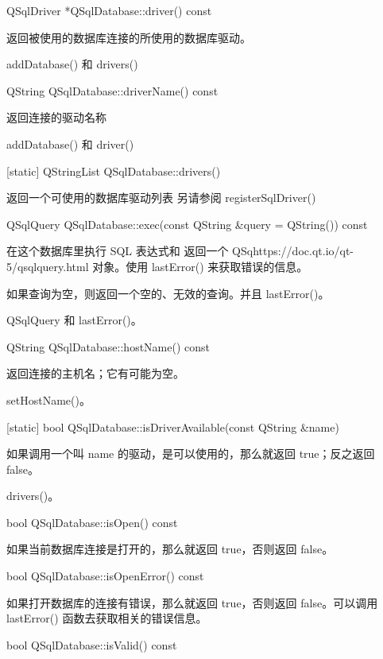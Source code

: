 QSqlDriver *QSqlDatabase::driver() const

返回被使用的数据库连接的所使用的数据库驱动。

\begin{seeAlso}
addDatabase() 和 drivers()
\end{seeAlso}

QString QSqlDatabase::driverName() const

返回连接的驱动名称

\begin{seeAlso}
addDatabase() 和 driver()
\end{seeAlso}

[static] QStringList QSqlDatabase::drivers()

返回一个可使用的数据库驱动列表 另请参阅 registerSqlDriver()

QSqlQuery QSqlDatabase::exec(const QString \&query = QString()) const


在这个数据库里执行 SQL 表达式和 返回一个 QSqhttps://doc.qt.io/qt-5/qsqlquery.html 对象。使用 lastError() 来获取错误的信息。

如果查询为空，则返回一个空的、无效的查询。并且 lastError()。

\begin{seeAlso}
QSqlQuery 和 lastError()。
\end{seeAlso}

QString QSqlDatabase::hostName() const


返回连接的主机名；它有可能为空。

\begin{seeAlso}
 setHostName()。
\end{seeAlso}


[static] bool QSqlDatabase::isDriverAvailable(const QString \&name)


如果调用一个叫 name 的驱动，是可以使用的，那么就返回 true；反之返回 false。

\begin{seeAlso}
drivers()。
\end{seeAlso}


bool QSqlDatabase::isOpen() const


如果当前数据库连接是打开的，那么就返回 true，否则返回 false。

bool QSqlDatabase::isOpenError() const


如果打开数据库的连接有错误，那么就返回 true，否则返回 false。可以调用 lastError() 函数去获取相关的错误信息。

bool QSqlDatabase::isValid() const


